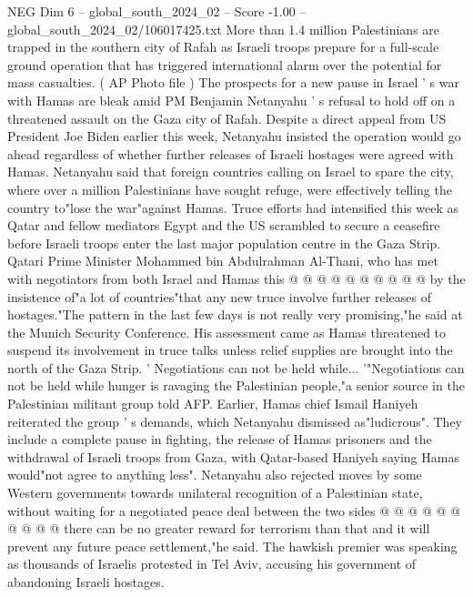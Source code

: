 \begin{textsample}{NEG Dim 6 – global\_south\_2024\_02 – Score -1.00 – global\_south\_2024\_02/106017425.txt}  \label{ex:f6_neg_276}
More than 1.4 million Palestinians are trapped in the southern city of Rafah as Israeli troops prepare for a full-scale ground operation that has triggered international alarm over the potential for mass casualties. ( AP Photo file ) The prospects for a new pause in Israel ' s war with Hamas are bleak amid PM Benjamin Netanyahu ' s refusal to hold off on a threatened assault on the Gaza city of Rafah.
Despite a direct appeal from US President Joe Biden earlier this week, Netanyahu insisted the operation would go ahead regardless of whether further releases of Israeli hostages were agreed with Hamas.
Netanyahu said that foreign countries calling on Israel to spare the city, where over a million Palestinians have sought refuge, were effectively telling the country to"lose the war"against Hamas.
Truce efforts had intensified this week as Qatar and fellow mediators Egypt and the US scrambled to secure a ceasefire before Israeli troops enter the last major population centre in the Gaza Strip.
Qatari Prime Minister Mohammed bin Abdulrahman Al-Thani, who has met with negotiators from both Israel and Hamas this @ @ @ @ @ @ @ @ @ @ by the insistence of"a lot of countries"that any new truce involve further releases of hostages."The pattern in the last few days is not really very promising,"he said at the Munich Security Conference.
His assessment came as Hamas threatened to suspend its involvement in truce talks unless relief supplies are brought into the north of the Gaza Strip. ' Negotiations can not be held while... '"Negotiations can not be held while hunger is ravaging the Palestinian people,"a senior source in the Palestinian militant group told AFP.
Earlier, Hamas chief Ismail Haniyeh reiterated the group ' s demands, which Netanyahu dismissed as"ludicrous".
They include a complete pause in fighting, the release of Hamas prisoners and the withdrawal of Israeli troops from Gaza, with Qatar-based Haniyeh saying Hamas would"not agree to anything less".
Netanyahu also rejected moves by some Western governments towards unilateral recognition of a Palestinian state, without waiting for a negotiated peace deal between the two sides @ @ @ @ @ @ @ @ @ @ there can be no greater reward for terrorism than that and it will prevent any future peace settlement,"he said.
The hawkish premier was speaking as thousands of Israelis protested in Tel Aviv, accusing his government of abandoning Israeli hostages.

\end{textsample}
